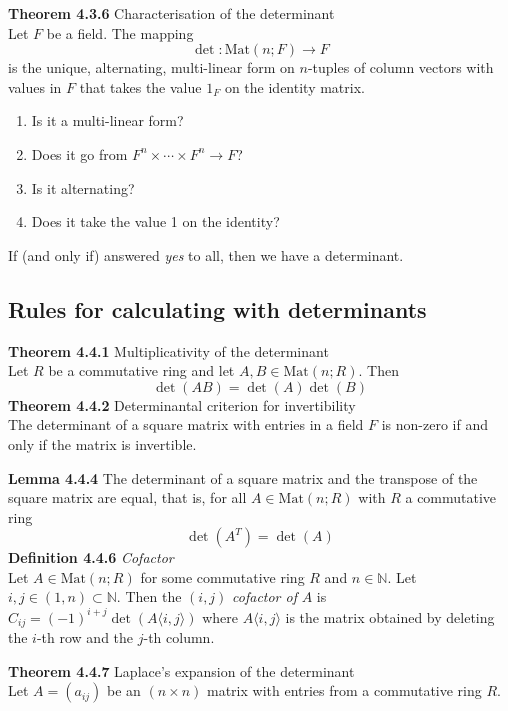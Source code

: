 \documentclass[8pt,landscape]{article}
\begin{document}
\begin{multicols}{3}
    \textbf{Theorem 4.3.6} Characterisation of the determinant \\
    Let $F$ be a field.
    The mapping
    \[
        \det : \mathrm{Mat}(n;F) \to F
    \]
    is the unique, alternating, multi-linear form on $n$-tuples of column vectors with
    values in $F$ that takes the value $1_F$ on the identity matrix.
    \begin{enumerate}
        \item Is it a multi-linear form?
        \item Does it go from $F^n \times \cdots \times F^n \to F$?
        \item Is it alternating?
        \item Does it take the value 1 on the identity?
    \end{enumerate}
    If (and only if) answered \emph{yes} to all, then we have a determinant.

    \subsection{Rules for calculating with determinants}

    \textbf{Theorem 4.4.1} Multiplicativity of the determinant \\
    Let $R$ be a commutative ring and let $A, B \in \mathrm{Mat}(n; R)$.
    Then
    \[
        \det(A B) = \det(A)\det(B)
    \]
    \textbf{Theorem 4.4.2} Determinantal criterion for invertibility \\
    The determinant of a square matrix with entries in a field $F$ is non-zero
    if and only if the matrix is invertible.

    \textbf{Lemma 4.4.4}
    The determinant of a square matrix and the transpose of the square matrix are equal,
    that is, for all $A \in \mathrm{Mat}(n; R)$ with $R$ a commutative ring
    \[
        \det(A^T) = \det(A)
    \]
    \textbf{Definition 4.4.6} \emph{Cofactor} \\
    Let $A \in \mathrm{Mat}(n; R)$ for some commutative ring $R$ and $n \in \mathbb{N}$.
    Let $i, j \in (1,n) \subset \mathbb{N}$.
    Then the $(i, j)$ \emph{cofactor of} $A$ is
    $C_{ij} = {(-1)}^{i+j} \det(A \langle i, j \rangle)$
    where $A \langle i, j \rangle$ is the matrix obtained by deleting the $i$-th row and
    the $j$-th column.

    \textbf{Theorem 4.4.7} Laplace's expansion of the determinant \\
    Let $A = (a_{ij})$ be an $(n \times n)$ matrix with entries from a commutative ring
    $R$.


\end{multicols}
\end{document}
